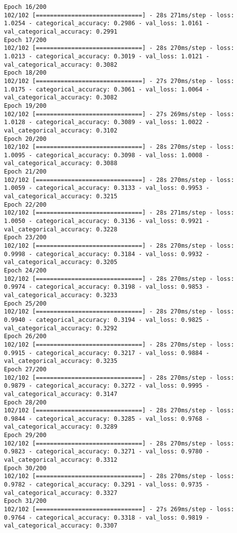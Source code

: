 \begin{lstlisting}
Epoch 16/200
102/102 [==============================] - 28s 271ms/step - loss: 1.0254 - categorical_accuracy: 0.2986 - val_loss: 1.0161 - val_categorical_accuracy: 0.2991
Epoch 17/200
102/102 [==============================] - 28s 270ms/step - loss: 1.0213 - categorical_accuracy: 0.3019 - val_loss: 1.0121 - val_categorical_accuracy: 0.3082
Epoch 18/200
102/102 [==============================] - 27s 270ms/step - loss: 1.0175 - categorical_accuracy: 0.3061 - val_loss: 1.0064 - val_categorical_accuracy: 0.3082
Epoch 19/200
102/102 [==============================] - 27s 269ms/step - loss: 1.0128 - categorical_accuracy: 0.3089 - val_loss: 1.0022 - val_categorical_accuracy: 0.3102
Epoch 20/200
102/102 [==============================] - 28s 270ms/step - loss: 1.0095 - categorical_accuracy: 0.3098 - val_loss: 1.0008 - val_categorical_accuracy: 0.3088
Epoch 21/200
102/102 [==============================] - 28s 270ms/step - loss: 1.0059 - categorical_accuracy: 0.3133 - val_loss: 0.9953 - val_categorical_accuracy: 0.3215
Epoch 22/200
102/102 [==============================] - 28s 271ms/step - loss: 1.0050 - categorical_accuracy: 0.3136 - val_loss: 0.9921 - val_categorical_accuracy: 0.3228
Epoch 23/200
102/102 [==============================] - 28s 270ms/step - loss: 0.9998 - categorical_accuracy: 0.3184 - val_loss: 0.9932 - val_categorical_accuracy: 0.3205
Epoch 24/200
102/102 [==============================] - 28s 270ms/step - loss: 0.9974 - categorical_accuracy: 0.3198 - val_loss: 0.9853 - val_categorical_accuracy: 0.3233
Epoch 25/200
102/102 [==============================] - 28s 270ms/step - loss: 0.9940 - categorical_accuracy: 0.3194 - val_loss: 0.9825 - val_categorical_accuracy: 0.3292
Epoch 26/200
102/102 [==============================] - 28s 270ms/step - loss: 0.9915 - categorical_accuracy: 0.3217 - val_loss: 0.9884 - val_categorical_accuracy: 0.3235
Epoch 27/200
102/102 [==============================] - 28s 270ms/step - loss: 0.9879 - categorical_accuracy: 0.3272 - val_loss: 0.9995 - val_categorical_accuracy: 0.3147
Epoch 28/200
102/102 [==============================] - 28s 270ms/step - loss: 0.9844 - categorical_accuracy: 0.3285 - val_loss: 0.9768 - val_categorical_accuracy: 0.3289
Epoch 29/200
102/102 [==============================] - 28s 270ms/step - loss: 0.9823 - categorical_accuracy: 0.3271 - val_loss: 0.9780 - val_categorical_accuracy: 0.3312
Epoch 30/200
102/102 [==============================] - 28s 270ms/step - loss: 0.9782 - categorical_accuracy: 0.3291 - val_loss: 0.9735 - val_categorical_accuracy: 0.3327
Epoch 31/200
102/102 [==============================] - 27s 269ms/step - loss: 0.9764 - categorical_accuracy: 0.3318 - val_loss: 0.9819 - val_categorical_accuracy: 0.3307

\end{lstlisting}
